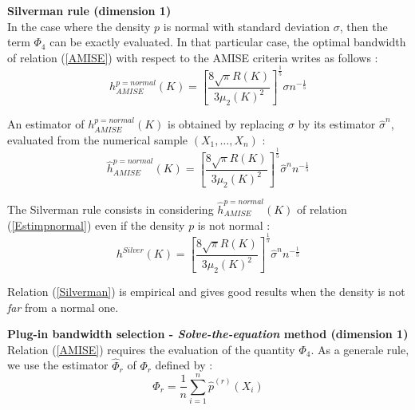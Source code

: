 {  \vspace*{0.5cm}
  \textbf{Silverman rule (dimension 1)}\\

  In the case where the density $p$ is normal with standard deviation $\sigma$, then the term $\Phi_4$ can be exactly evaluated. In that particular case,  the optimal bandwidth of relation (\ref{AMISE}) with respect to the AMISE criteria writes as follows :
  \begin{equation}
    \label{pNormal}
    h^{p = normal}_{AMISE}(K) = \displaystyle \left[ \frac{8\sqrt{\pi} R(K)}{3\mu_2(K)^2}\right]^{\frac{1}{5}}\sigma n^{-\frac{1}{5}}
  \end{equation}

  An estimator of $h^{p= normal}_{AMISE}(K)$ is obtained by replacing $\sigma$ by its estimator $\hat{\sigma}^n$,  evaluated from the  numerical sample $(X_1, \dots, X_n)$ :
  \begin{equation}
    \label{Estimpnormal}
    \hat{h}^{p = normal}_{AMISE}(K) = \displaystyle \left[ \frac{8\sqrt{\pi} R(K)}{3\mu_2(K)^2}\right]^{\frac{1}{5}}\hat{\sigma}^n n^{-\frac{1}{5}}
  \end{equation}

  The Silverman rule consists in considering $\hat{h}^{p = normal}_{AMISE}(K)$ of relation (\ref{Estimpnormal}) even if the density $p$ is not normal :
  \begin{equation}
    \label{Silverman}
    h^{Silver}(K) = \displaystyle \left[ \frac{8\sqrt{\pi} R(K)}{3\mu_2(K)^2}\right]^{\frac{1}{5}}\hat{\sigma}^n n^{-\frac{1}{5}}
  \end{equation}

  Relation (\ref{Silverman}) is empirical and gives good results when the density is not \emph{far} from a normal one.




  \vspace*{0.5cm}

  \textbf{Plug-in bandwidth selection - \emph{Solve-the-equation} method (dimension 1)}\\



  Relation (\ref{AMISE}) requires the evaluation of the quantity $\Phi_4$. As a generale rule, we use the estimator $\hat{\Phi}_r$ of $\Phi_r$ defined by :
  \begin{equation}
    \label{EstimPhir}
    \hat{\Phi}_r = \displaystyle \frac{1}{n}\sum_{i=1}^{n} \hat{p}^{(r)}(X_i)
  \end{equation}

}
